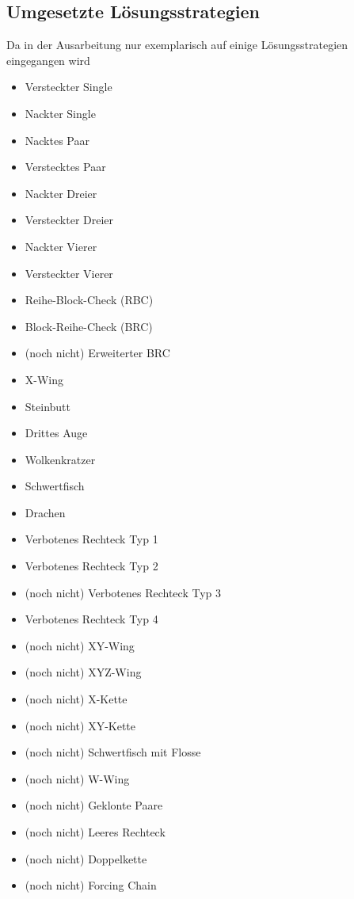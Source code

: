 \subsection{Umgesetzte Lösungsstrategien}
Da in der Ausarbeitung nur exemplarisch auf einige Lösungsstrategien eingegangen wird
\begin{itemize}
	\item Versteckter Single
	\item Nackter Single
	\item Nacktes Paar
	\item Verstecktes Paar
	\item Nackter Dreier
	\item Versteckter Dreier
	\item Nackter Vierer
	\item Versteckter Vierer
	\item Reihe-Block-Check (RBC)
	\item Block-Reihe-Check (BRC)
	\item (noch nicht) Erweiterter BRC
	\item X-Wing
	\item Steinbutt
	\item Drittes Auge
	\item Wolkenkratzer
	\item Schwertfisch
	\item Drachen
	\item Verbotenes Rechteck Typ 1
	\item Verbotenes Rechteck Typ 2
	\item (noch nicht) Verbotenes Rechteck Typ 3
	\item Verbotenes Rechteck Typ 4
	\item (noch nicht) XY-Wing
	\item (noch nicht) XYZ-Wing
	\item (noch nicht) X-Kette
	\item (noch nicht) XY-Kette
	\item (noch nicht) Schwertfisch mit Flosse
	\item (noch nicht) W-Wing
	\item (noch nicht) Geklonte Paare
	\item (noch nicht) Leeres Rechteck
	\item (noch nicht) Doppelkette
	\item (noch nicht) Forcing Chain
	
\end{itemize}